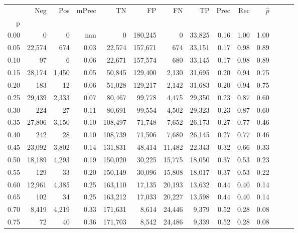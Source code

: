 \begin{tabular}{rrrrrrrrrrrrrr}
\toprule
{} &     Neg &    Pos & mPrec &       TN &       FP &      FN &      TP &  Prec &   Rec & $\hat{p}$ \\
p    &         &        &       &          &          &         &         &       &       &           \\
\midrule
0.00 &       0 &      0 &   nan &        0 &  180,245 &       0 &  33,825 &  0.16 &  1.00 &      1.00 \\
0.05 &  22,574 &    674 &  0.03 &   22,574 &  157,671 &     674 &  33,151 &  0.17 &  0.98 &      0.89 \\
0.10 &      97 &      6 &  0.06 &   22,671 &  157,574 &     680 &  33,145 &  0.17 &  0.98 &      0.89 \\
0.15 &  28,174 &  1,450 &  0.05 &   50,845 &  129,400 &   2,130 &  31,695 &  0.20 &  0.94 &      0.75 \\
0.20 &     183 &     12 &  0.06 &   51,028 &  129,217 &   2,142 &  31,683 &  0.20 &  0.94 &      0.75 \\
0.25 &  29,439 &  2,333 &  0.07 &   80,467 &   99,778 &   4,475 &  29,350 &  0.23 &  0.87 &      0.60 \\
0.30 &     224 &     27 &  0.11 &   80,691 &   99,554 &   4,502 &  29,323 &  0.23 &  0.87 &      0.60 \\
0.35 &  27,806 &  3,150 &  0.10 &  108,497 &   71,748 &   7,652 &  26,173 &  0.27 &  0.77 &      0.46 \\
0.40 &     242 &     28 &  0.10 &  108,739 &   71,506 &   7,680 &  26,145 &  0.27 &  0.77 &      0.46 \\
0.45 &  23,092 &  3,802 &  0.14 &  131,831 &   48,414 &  11,482 &  22,343 &  0.32 &  0.66 &      0.33 \\
0.50 &  18,189 &  4,293 &  0.19 &  150,020 &   30,225 &  15,775 &  18,050 &  0.37 &  0.53 &      0.23 \\
0.55 &     129 &     33 &  0.20 &  150,149 &   30,096 &  15,808 &  18,017 &  0.37 &  0.53 &      0.22 \\
0.60 &  12,961 &  4,385 &  0.25 &  163,110 &   17,135 &  20,193 &  13,632 &  0.44 &  0.40 &      0.14 \\
0.65 &     102 &     34 &  0.25 &  163,212 &   17,033 &  20,227 &  13,598 &  0.44 &  0.40 &      0.14 \\
0.70 &   8,419 &  4,219 &  0.33 &  171,631 &    8,614 &  24,446 &   9,379 &  0.52 &  0.28 &      0.08 \\
0.75 &      72 &     40 &  0.36 &  171,703 &    8,542 &  24,486 &   9,339 &  0.52 &  0.28 &      0.08 \\

\end{tabular}
